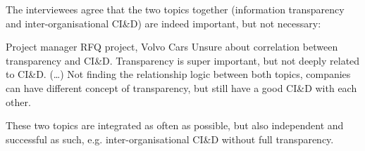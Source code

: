 %
%
%
%
%
%
%
%
 The interviewees agree that the two topics together (information transparency and inter-organisational CI\&D) are indeed important, but not necessary: 

\begin{aquote}{Project manager RFQ project, Volvo Cars}
Unsure about correlation between transparency and CI\&D. Transparency is super important, but not deeply related to CI\&D. (…) Not finding the relationship logic between both topics, companies can have different concept of transparency, but still have a good CI\&D with each other.
\end{aquote}

These two topics are integrated as often as possible, but also independent and successful as such, e.g. inter-organisational CI\&D without full transparency. 

